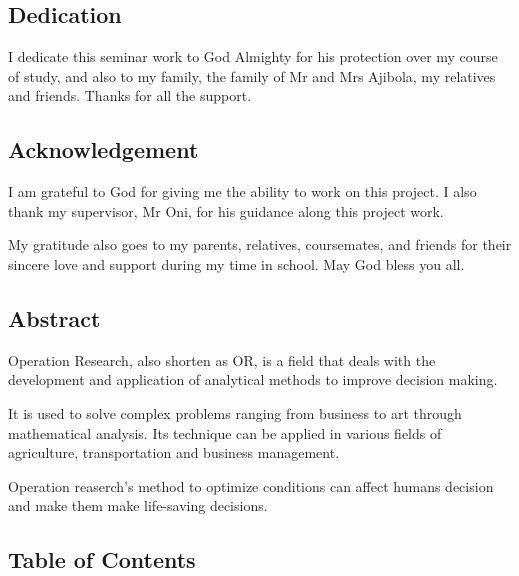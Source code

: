 \documentclass{article}
\begin{document}
\newpage

\begin{center}
	\subsection{Dedication}
\end{center}


I dedicate this seminar work to God Almighty for his protection over my course of study, and also to my family, the family of Mr and Mrs Ajibola, my relatives and friends. Thanks for all the support.

\newpage

\begin{center}
	\subsection{Acknowledgement}
\end{center}

I am grateful to God for giving me the ability to work on this project. I also thank my supervisor, Mr Oni, for his guidance along this project work.

My gratitude also goes to my parents, relatives, coursemates, and friends for their sincere love and support during my time in school. May God bless you all.

\newpage

\begin{center}
	\subsection{Abstract}
\end{center}


Operation Research, also shorten as OR, is a field that deals with the development and application of analytical methods to improve decision making. 

It is used to solve complex problems ranging from business to art through mathematical analysis. Its technique can be applied in various fields of agriculture, transportation and business management.

Operation reaserch's method to optimize conditions can affect humans decision and make them make life-saving decisions.

\newpage

\subsection{Table of Contents}
\tableofcontents
\end{document}
